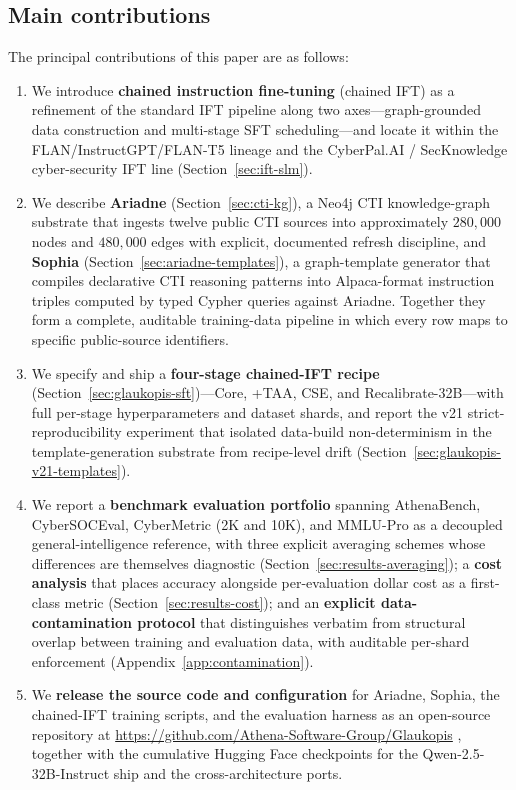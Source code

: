 \documentclass[conference]{IEEEtran}
\begin{document}
\subsection{Main contributions}
\label{sec:intro-main-contributions}
The principal contributions of this paper are as follows:

\begin{enumerate}
  \item We introduce \textbf{chained instruction fine-tuning} (chained IFT) as a refinement of the standard IFT pipeline along two axes---graph-grounded data construction and multi-stage SFT scheduling---and locate it within the FLAN/InstructGPT/FLAN-T5 lineage and the CyberPal.AI / SecKnowledge cyber-security IFT line (Section~\ref{sec:ift-slm}).

  \item We describe \textbf{Ariadne} (Section~\ref{sec:cti-kg}), a Neo4j CTI knowledge-graph substrate that ingests twelve public CTI sources into approximately $280{,}000$ nodes and $480{,}000$ edges with explicit, documented refresh discipline, and \textbf{Sophia} (Section~\ref{sec:ariadne-templates}), a graph-template generator that compiles declarative CTI reasoning patterns into Alpaca-format instruction triples computed by typed Cypher queries against Ariadne. Together they form a complete, auditable training-data pipeline in which every row maps to specific public-source identifiers.

  \item We specify and ship a \textbf{four-stage chained-IFT recipe} (Section~\ref{sec:glaukopis-sft})---Core, +TAA, CSE, and Recalibrate-32B---with full per-stage hyperparameters and dataset shards, and report the v21 strict-reproducibility experiment that isolated data-build non-determinism in the template-generation substrate from recipe-level drift (Section~\ref{sec:glaukopis-v21-templates}).

  \item We report a \textbf{benchmark evaluation portfolio} spanning AthenaBench, CyberSOCEval, CyberMetric (2K and 10K), and MMLU-Pro as a decoupled general-intelligence reference, with three explicit averaging schemes whose differences are themselves diagnostic (Section~\ref{sec:results-averaging}); a \textbf{cost analysis} that places accuracy alongside per-evaluation dollar cost as a first-class metric (Section~\ref{sec:results-cost}); and an \textbf{explicit data-contamination protocol} that distinguishes verbatim from structural overlap between training and evaluation data, with auditable per-shard enforcement (Appendix~\ref{app:contamination}).

  \item We \textbf{release the source code and configuration} for Ariadne, Sophia, the chained-IFT training scripts, and the evaluation harness as an open-source repository at \url{https://github.com/Athena-Software-Group/Glaukopis} \cite{glaukopis2026repo}, together with the cumulative Hugging Face checkpoints for the Qwen-2.5-32B-Instruct ship and the cross-architecture ports.
\end{enumerate}
\end{document}
